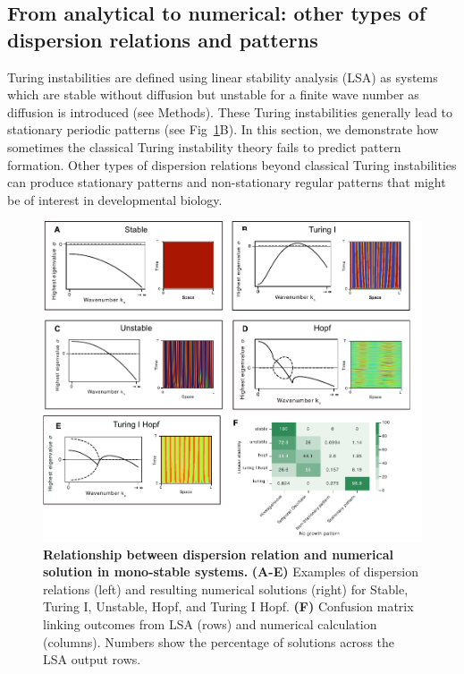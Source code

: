 \documentclass[10pt,letterpaper]{article}
\begin{document}
\subsection*{From analytical to numerical: other types of dispersion relations and patterns} \label{nogrowth}

Turing instabilities are defined using linear stability analysis (LSA) as systems which are stable without diffusion but unstable for a finite wave number as diffusion is introduced (see Methods). These Turing instabilities generally lead to stationary periodic patterns (see Fig~\ref{fig:dispersions}B). In this section, we demonstrate how sometimes the classical Turing instability theory fails to predict pattern formation.
Other types of dispersion relations beyond classical Turing instabilities can produce stationary patterns and non-stationary regular patterns that might be of interest in developmental biology.


\begin{figure}[bp!]
    \includegraphics[width=1\textwidth]{figures/dispersion} %
    \caption{\textbf{Relationship between dispersion relation and numerical solution in mono-stable systems.} \textbf{(A-E)} Examples of dispersion relations (left) and resulting numerical solutions (right) for Stable, Turing I, Unstable, Hopf, and Turing I Hopf. \textbf{(F)} Confusion matrix linking outcomes from LSA (rows) and numerical calculation (columns). Numbers show the percentage of solutions across the LSA output rows.}
    \label{fig:dispersions} %
\end{figure}
\end{document}
